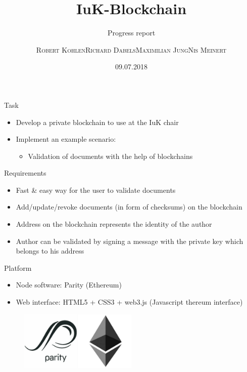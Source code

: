 \documentclass[10pt]{beamer}
\title{IuK-Blockchain}
\subtitle{Progress report}
\author{\textsc{Robert Kohlen}\newline\textsc{Richard Dabels}\newline\textsc{Maximilian Jung}\newline\textsc{Nis Meinert}}
\date{09.07.2018}
\begin{document}
\begin{frame}
	\titlepage
\end{frame}

\begin{frame}{Task}
	\begin{itemize}
		\item Develop a private blockchain to use at the IuK chair
		\item Implement an example scenario:
		\begin{itemize}
			\item Validation of documents with the help of blockchains
		\end{itemize}
	\end{itemize}
\end{frame}

\begin{frame}{Requirements}
	\begin{itemize}
		\item Fast \& easy way for the user to validate documents
		\item Add/update/revoke documents (in form of checksums) on the blockchain
		\item Address on the blockchain represents the identity of the author
		\item Author can be validated by signing a message with the private key which belongs to his address
	\end{itemize}
\end{frame}

\begin{frame}{Platform}
	\begin{itemize}
		\item Node software: Parity (Ethereum)
		\item Web interface: HTML5 + CSS3 + web3.js (Javascript thereum interface)
	\end{itemize}
	\begin{figure}
		\includegraphics[width=0.5\textwidth]{images/parity-ethereum-logo.png}
	\end{figure}
\end{frame}
\end{document}
